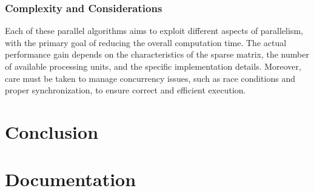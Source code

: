 \documentclass[12pt,oneside]{book} %
\begin{document}
\subsection*{Complexity and Considerations}

Each of these parallel algorithms aims to exploit different aspects of
parallelism, with the primary goal of reducing the overall computation time.
The actual performance gain depends on the characteristics of the sparse
matrix, the number of available processing units, and the specific
implementation details. Moreover, care must be taken to manage concurrency
issues, such as race conditions and proper synchronization, to ensure correct
and efficient execution.

\newpage
\chapter{Conclusion}




\appendix
\chapter{Documentation}
\end{document}
